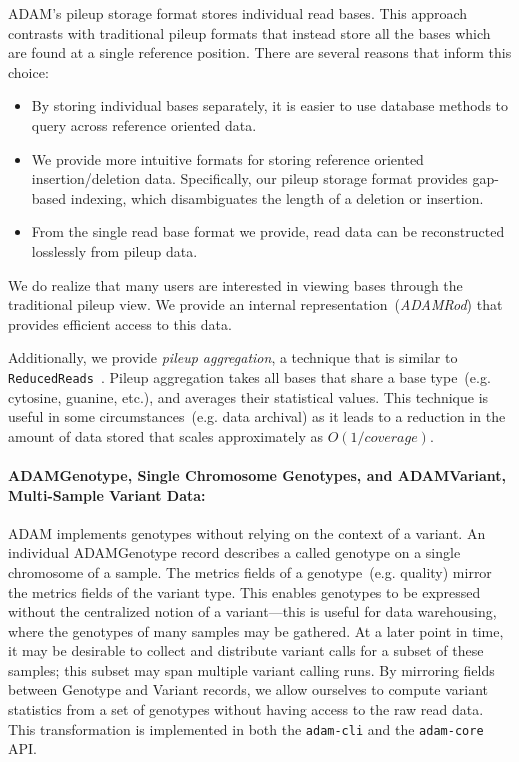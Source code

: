 \documentclass{bioinfo}
\begin{document}
ADAM's pileup storage format stores individual read bases. This approach contrasts with traditional pileup formats that instead store all the bases which are found at a single
reference position. There are several reasons that inform this choice:

\begin{itemize}
\item By storing individual bases separately, it is easier to use database methods to query across reference oriented data.
\item We provide more intuitive formats for storing reference oriented insertion/deletion data. Specifically, our pileup storage format provides gap-based indexing, which
disambiguates the length of a deletion or insertion.
\item From the single read base format we provide, read data can be reconstructed losslessly from pileup data.
\end{itemize}

We do realize that many users are interested in viewing bases through the traditional pileup view. We provide an internal representation~(\textit{ADAMRod}) that provides
efficient access to this data.

Additionally, we provide \emph{pileup aggregation}, a technique that is similar to \texttt{ReducedReads}~\citep[see][]{mckenna10}. Pileup aggregation takes all bases that
share a base type~(e.g. cytosine, guanine, etc.), and averages their statistical values. This technique is useful in some circumstances~(e.g. data archival) as it leads to a
reduction in the amount of data stored that scales approximately as $O(1/coverage)$.

\paragraph{ADAMGenotype, Single Chromosome Genotypes, and ADAMVariant, Multi-Sample Variant Data:}
\label{sec:adamvariant}

ADAM implements genotypes without relying on the context of a variant. An individual ADAMGenotype record describes a called genotype on a single chromosome of a
sample. The metrics fields of a genotype~(e.g. quality) mirror the metrics fields of the variant type. This enables genotypes to be expressed without the centralized notion
of a variant---this is useful for data warehousing, where the genotypes of many samples may be gathered. At a later point in time, it may be desirable to collect and distribute
variant calls for a subset of these samples; this subset may span multiple variant calling runs. By mirroring fields between Genotype and Variant records, we allow ourselves
to compute variant statistics from a set of genotypes without having access to the raw read data. This transformation is implemented in both the \texttt{adam-cli} and the
\texttt{adam-core} API.
\end{document}
